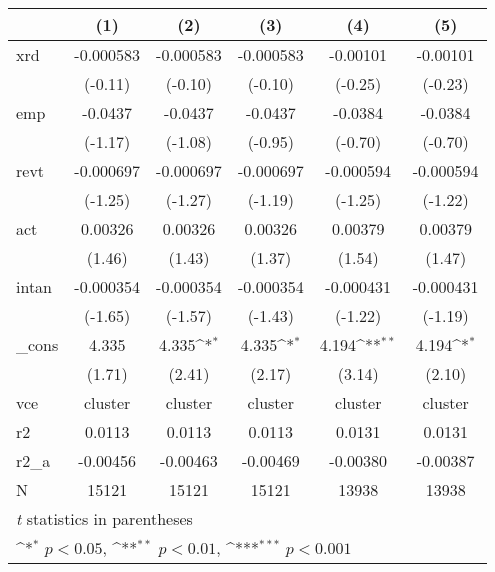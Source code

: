 {
\def\sym#1{\ifmmode^{#1}\else\(^{#1}\)\fi}
\begin{tabular}{l*{5}{c}}
\hline\hline
            &\multicolumn{1}{c}{(1)}         &\multicolumn{1}{c}{(2)}         &\multicolumn{1}{c}{(3)}         &\multicolumn{1}{c}{(4)}         &\multicolumn{1}{c}{(5)}         \\
\hline
xrd         &   -0.000583         &   -0.000583         &   -0.000583         &    -0.00101         &    -0.00101         \\
            &     (-0.11)         &     (-0.10)         &     (-0.10)         &     (-0.25)         &     (-0.23)         \\
[1em]
emp         &     -0.0437         &     -0.0437         &     -0.0437         &     -0.0384         &     -0.0384         \\
            &     (-1.17)         &     (-1.08)         &     (-0.95)         &     (-0.70)         &     (-0.70)         \\
[1em]
revt        &   -0.000697         &   -0.000697         &   -0.000697         &   -0.000594         &   -0.000594         \\
            &     (-1.25)         &     (-1.27)         &     (-1.19)         &     (-1.25)         &     (-1.22)         \\
[1em]
act         &     0.00326         &     0.00326         &     0.00326         &     0.00379         &     0.00379         \\
            &      (1.46)         &      (1.43)         &      (1.37)         &      (1.54)         &      (1.47)         \\
[1em]
intan       &   -0.000354         &   -0.000354         &   -0.000354         &   -0.000431         &   -0.000431         \\
            &     (-1.65)         &     (-1.57)         &     (-1.43)         &     (-1.22)         &     (-1.19)         \\
[1em]
\_cons      &       4.335         &       4.335\sym{*}  &       4.335\sym{*}  &       4.194\sym{**} &       4.194\sym{*}  \\
            &      (1.71)         &      (2.41)         &      (2.17)         &      (3.14)         &      (2.10)         \\
\hline
vce         &     cluster         &     cluster         &     cluster         &     cluster         &     cluster         \\
r2          &      0.0113         &      0.0113         &      0.0113         &      0.0131         &      0.0131         \\
r2\_a        &    -0.00456         &    -0.00463         &    -0.00469         &    -0.00380         &    -0.00387         \\
N           &       15121         &       15121         &       15121         &       13938         &       13938         \\
\hline\hline
\multicolumn{6}{l}{\footnotesize \textit{t} statistics in parentheses}\\
\multicolumn{6}{l}{\footnotesize \sym{*} \(p<0.05\), \sym{**} \(p<0.01\), \sym{***} \(p<0.001\)}\\
\end{tabular}
}
